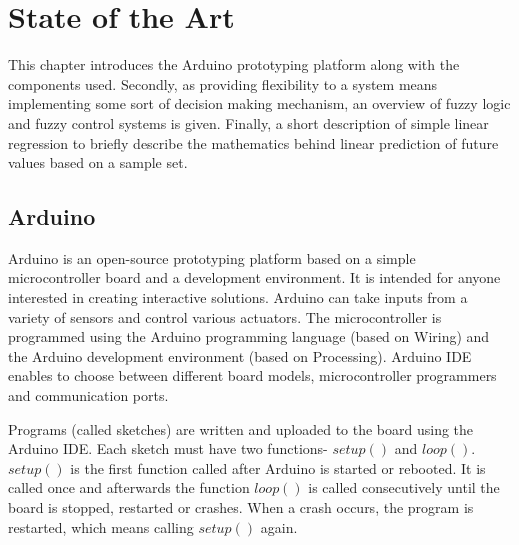 

\chapter{State of the Art} %

This chapter introduces the Arduino prototyping platform along with the components used. Secondly, as providing flexibility to a system means implementing some sort of decision making mechanism, an overview of fuzzy logic and fuzzy control systems is given. Finally, a short description of simple linear regression to briefly describe the mathematics behind linear prediction of future values based on a sample set.


\ifpdf
    \graphicspath{{X/figures/PNG/}{X/figures/PDF/}{X/figures/}}
\else
    \graphicspath{{X/figures/EPS/}{X/figures/}}
\fi


\section{Arduino}

Arduino \cite{arduinoHome} is an open-source prototyping platform based on a simple microcontroller board and a development environment. It is intended for anyone interested in creating interactive solutions. Arduino can take inputs from a variety of sensors and control various actuators. The microcontroller is programmed using the Arduino programming language (based on Wiring) and the Arduino development environment (based on Processing). Arduino IDE enables to choose between different board models, microcontroller programmers and communication ports. 

Programs (called sketches) are written and uploaded to the board using the Arduino IDE. Each sketch must have two functions- $setup()$ and $loop()$. $setup()$ is the first function called after Arduino is started or rebooted. It is called once and afterwards the function $loop()$ is called consecutively until the board is stopped, restarted or crashes. When a crash occurs, the program is restarted, which means calling $setup()$ again. 

